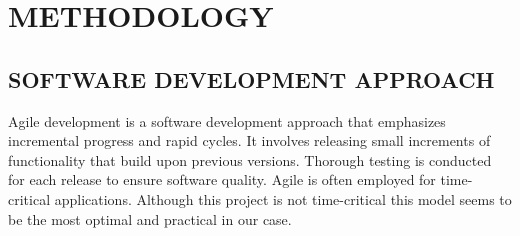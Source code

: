 \chapter{METHODOLOGY}
\section{SOFTWARE DEVELOPMENT APPROACH}
Agile development is a software development approach that emphasizes incremental progress and rapid cycles. It involves releasing small increments of functionality that build upon previous versions. Thorough testing is conducted for each release to ensure software quality. Agile is often employed for time-critical applications. Although this project is not time-critical this model seems to be the most optimal and practical in our case.
\begin{figure}[hbt!]
\end{figure}
\newpage
